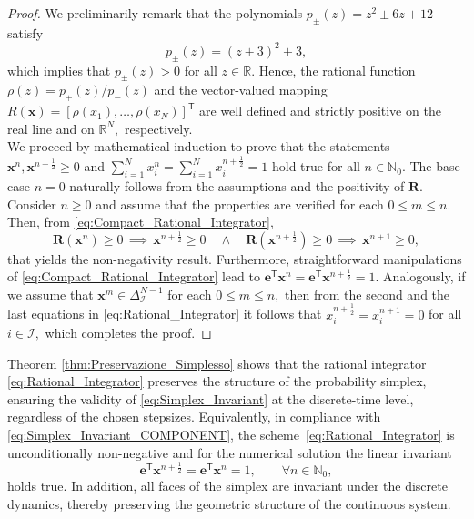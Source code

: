 \documentclass[11pt,letterpaper]{article}
\theoremstyle{remark}
\begin{document}
\begin{proof}
    We preliminarily remark that the polynomials \( p_{\pm}(z) = z^2 \pm 6z + 12 \) satisfy
    \begin{equation*}
        p_{\pm}(z) = (z \pm 3)^2 + 3,
    \end{equation*}
    which implies that $p_{\pm}(z) > 0$ for all $z \in \mathbb{R}$. Hence, the rational function $\rho(z)=p_+(z) / p_-(z)$ and the vector-valued mapping $R(\bm{x})=[\rho(x_1),\dots,\rho(x_N)]^\mathsf{T}$ are well defined and strictly positive on the real line and on $\mathbb{R}^N,$ respectively. \\
    We proceed by mathematical induction to prove that the statements $\bm{x}^n,\bm{x}^{n+\frac{1}{2}}\geq 0$ and $\textstyle\sum_{i=1}^{N} x_i^n =\textstyle\sum_{i=1}^{N} x_i^{n+\frac{1}{2}} = 1$ hold true for all $n\in\mathbb{N}_0.$ The base case $n=0$ naturally follows from the assumptions and the positivity of $\bm{R}$. Consider $n\geq0$ and assume that the properties are verified for each $0\leq m \leq n.$ Then, from \eqref{eq:Compact_Rational_Integrator},
    \begin{equation*}
        \bm{R}(\bm{x}^n)\geq 0 \, \implies \, \bm{x}^{n+\frac{1}{2}} \geq 0 \quad \wedge \quad \bm{R}(\bm{x}^{n+\frac{1}{2}})\geq 0 \, \implies \, \bm{x}^{n+1}\geq0,
    \end{equation*}
    that yields the non-negativity result. Furthermore, straightforward manipulations of \eqref{eq:Compact_Rational_Integrator} lead to $\bm{e}^{\mathsf{T}}  \bm{x}^n=\bm{e}^{\mathsf{T}}  \bm{x}^{n+\frac{1}{2}}=1.$ Analogously, if we assume that $\bm{x}^m\in \Delta^{N-1}_\mathcal{I}$ for each $0\leq m \leq n,$ then from the second and the last equations in \eqref{eq:Rational_Integrator} it follows that $x_i^{n+\frac{1}{2}}=x_i^{n+1}=0$ for all $i\in\mathcal{I},$ which completes the proof.
\end{proof}

Theorem \ref{thm:Preservazione_Simplesso} shows that the rational integrator \eqref{eq:Rational_Integrator} preserves the structure of the probability simplex, ensuring the validity of \eqref{eq:Simplex_Invariant} at the discrete-time level, regardless of the chosen stepsizes. Equivalently, in compliance with \eqref{eq:Simplex_Invariant_COMPONENT}, the scheme~\eqref{eq:Rational_Integrator} is unconditionally non-negative and for the numerical solution the linear invariant
\begin{equation}\label{eq:discrete_Linear_Invariant}
    \bm{e}^{\mathsf{T}}  \bm{x}^{n+\frac{1}{2}}=\bm{e}^{\mathsf{T}}  \bm{x}^n=1, \qquad \forall n \in \mathbb{N}_0,
\end{equation}
holds true. In addition, all faces of the simplex are invariant under the discrete dynamics, thereby preserving the geometric structure of the continuous system.
\end{document}

